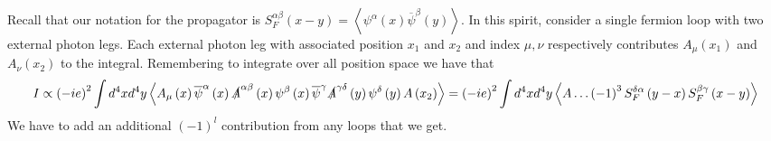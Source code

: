 \documentclass[11pt, oneside]{article}   	%
\theoremstyle{slanted}
\begin{document}
Recall that our notation for the propagator is 
$ S _ F ^{\alpha \beta } \left( x - y  \right)   = \left< \psi  ^{ \alpha } \left( x  \right)  
\overline{ \psi } ^{ \beta } \left( y  \right)  \right>$. 
In this spirit, consider 
a single fermion loop with two external 
photon legs. Each external photon 
leg with associated position $ x _ 1 $ and $ x _ 2 $
and index $ \mu , \nu $ respectively
contributes $A _ \mu \left( x_1  \right)  $ and $ A _ \nu \left( x _ 2  \right)  $ 
to the integral. Remembering to 
integrate over all position space we have 
that 
\[
I \propto \left( - i e  \right)  ^{ 2 } 
\int d ^ 4 x d ^ 4 y \left< A _ \mu \left( x  \right)  
\overline{ \psi  } ^{ \alpha } \left(  x   \right) \slashed{A}^{\alpha\beta } \left( x  \right)  
\psi ^{ \beta } \left(  x \right)  \overline{ \psi } ^{ \gamma } \slashed{A}^{ 
\gamma \delta } \left( y  \right)  \psi^{ \delta } \left( y  \right)  
A \left( x_ 2  \right)  
\right> = \left( - i e  \right)  ^{ 2 } \int d ^ 4 x d ^ 4 y 
\left< A \dots \left( - 1  \right)  ^{ 3 }  S_F ^{ \delta \alpha } \left( y - x  \right)  S _ F 
^{ \beta \gamma } \left( x -y  \right)  \right> 
\] We have to add an additional $ \left( -1  \right)  ^{ l } $ 
contribution from any loops that we get. 
\end{document}
